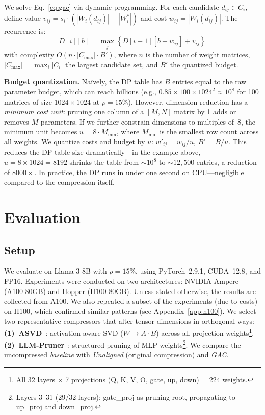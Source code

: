 \documentclass[sigplan,10pt]{acmart}
\begin{document}
We solve Eq.~\ref{eq:gac} via dynamic programming.
For each candidate $d_{ij} \in C_i$, define value $v_{ij} = s_i \cdot (|W_i(d_{ij})| - |W_i^*|)$ and cost $w_{ij} = |W_i(d_{ij})|$.
The recurrence is:
\[
D[i][b] = \max_{j} \left\{ D[i{-}1][b - w_{ij}] + v_{ij} \right\}
\]
with complexity $O(n \cdot |C_{\max}| \cdot B')$, where $n$ is the number of weight matrices, $|C_{\max}| = \max_i |C_i|$ the largest candidate set, and $B'$ the quantized budget.

\noindent \textbf{Budget quantization.}
Na\"ively, the DP table has $B$ entries equal to the raw parameter budget, which can reach billions (e.g., $0.85 \times 100 \times 1024^2 \approx 10^8$ for 100 matrices of size $1024{\times}1024$ at $\rho{=}15\%$).
However, dimension reduction has a \emph{minimum cost unit}: pruning one column of a $[M,N]$ matrix by 1 adds or removes $M$ parameters.
If we further constrain dimensions to multiples of~8, the minimum unit becomes $u = 8 \cdot M_{\min}$, where $M_{\min}$ is the smallest row count across all weights.
We quantize costs and budget by $u$: $w'_{ij} = w_{ij} / u$, $B' = B / u$.
This reduces the DP table size dramatically---in the example above, $u{=}8{\times}1024{=}8192$ shrinks the table from ${\sim}10^8$ to ${\sim}12{,}500$ entries, a reduction of $8000{\times}$.
In practice, the DP runs in under one second on CPU---negligible compared to the compression itself.



\section{Evaluation}
\label{sec:eval}

\subsection{Setup}

We evaluate on Llama-3-8B with $\rho=15\%$, using PyTorch~2.9.1, CUDA~12.8, and FP16. Experiments were conducted on two architectures: NVIDIA Ampere (A100-80GB) and Hopper (H100-80GB). Unless stated otherwise, the results are collected from A100.
We also repeated a subset of the experiments (due to costs) on H100, which confirmed similar patterns (see Appendix~\ref{app:h100}).
We select two representative compressors that alter tensor dimensions in orthogonal ways:
\textbf{(1)~ASVD}~\citep{asvd}: activation-aware SVD ($W \to A \cdot B$) across all projection weights\footnote{All 32 layers $\times$ 7 projections (Q, K, V, O, gate, up, down) = 224 weights.}.
\textbf{(2)~LLM-Pruner}~\citep{llmpruner}: structured pruning of MLP weights\footnote{Layers 3--31 (29/32 layers); gate\_proj as pruning root, propagating to up\_proj and down\_proj.}.
We compare the uncompressed \emph{baseline} with \emph{Unaligned} (original compression) and \emph{GAC}.
\end{document}
